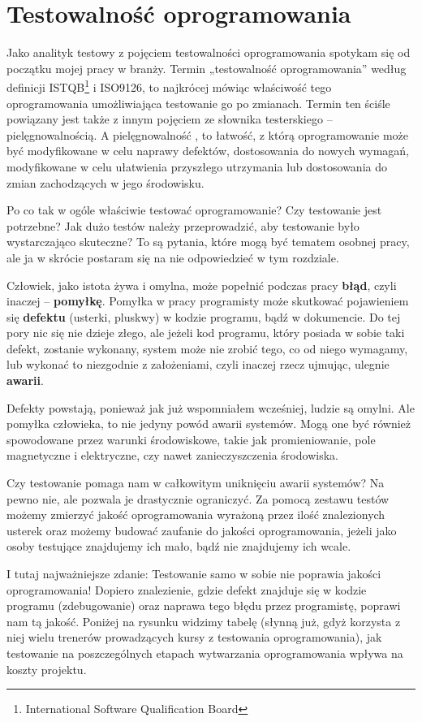 \chapter{Testowalność oprogramowania}

Jako analityk testowy z pojęciem testowalności oprogramowania spotykam się od początku mojej pracy w branży. Termin „testowalność oprogramowania” \cite{bib:iso_9126}  według definicji ISTQB\footnote{International Software Qualification Board}  i ISO9126, to najkrócej mówiąc właściwość tego oprogramowania umożliwiająca testowanie go po zmianach. Termin ten ściśle powiązany jest także z innym pojęciem ze słownika testerskiego – pielęgnowalnością. A pielęgnowalność , to łatwość, z którą oprogramowanie może być modyfikowane w celu naprawy defektów, dostosowania do nowych wymagań, modyfikowane w celu ułatwienia przyszłego utrzymania lub dostosowania do zmian zachodzących w jego środowisku.

Po co tak w ogóle właściwie testować oprogramowanie? Czy testowanie jest potrzebne? Jak dużo testów należy przeprowadzić, aby testowanie było wystarczająco skuteczne? To są pytania, które mogą być tematem osobnej pracy, ale ja w skrócie postaram się na nie odpowiedzieć w tym rozdziale.

Człowiek, jako istota żywa i omylna, może popełnić podczas pracy \textbf{błąd}, czyli inaczej – \textbf{pomyłkę}. Pomyłka w pracy programisty może skutkować pojawieniem się \textbf{defektu} (usterki, pluskwy) w kodzie programu, bądź w dokumencie. Do tej pory nic się nie dzieje złego, ale jeżeli kod programu, który posiada w sobie taki defekt, zostanie wykonany, system może nie zrobić tego, co od niego wymagamy, lub wykonać to niezgodnie z założeniami, czyli inaczej rzecz ujmując, ulegnie \textbf{awarii}. 

Defekty powstają, ponieważ jak już wspomniałem wcześniej, ludzie są omylni. Ale pomyłka człowieka, to nie jedyny powód awarii systemów. Mogą one być również spowodowane przez warunki środowiskowe, takie jak promieniowanie, pole magnetyczne i elektryczne, czy nawet zanieczyszczenia środowiska.

Czy testowanie pomaga nam w całkowitym uniknięciu awarii systemów? Na pewno nie, ale pozwala je drastycznie ograniczyć. Za pomocą zestawu testów możemy zmierzyć jakość oprogramowania wyrażoną przez ilość znalezionych usterek oraz możemy budować zaufanie do jakości oprogramowania, jeżeli jako osoby testujące znajdujemy ich mało, bądź nie znajdujemy ich wcale.

I tutaj najważniejsze zdanie: Testowanie samo w sobie nie poprawia jakości oprogramowania! Dopiero znalezienie, gdzie defekt znajduje się w kodzie programu (zdebugowanie) oraz naprawa tego błędu przez programistę, poprawi nam tą jakość. Poniżej na rysunku widzimy tabelę (słynną już, gdyż korzysta z niej wielu trenerów prowadzących kursy z testowania oprogramowania), jak testowanie na poszczególnych etapach wytwarzania oprogramowania wpływa na koszty projektu.

